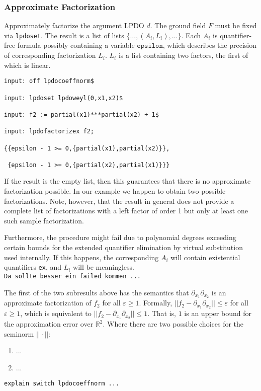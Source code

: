 \subsubsection{Approximate Factorization}

Approximately factorize the argument LPDO $d$. The ground field $F$ must
be fixed via \texttt{lpdoset}. The result is a list of lists
$\{\dots,(A_i,L_i),\dots\}$. Each $A_i$ is quantifier-free formula
possibly containing a variable $\texttt{epsilon}$, which describes the
precision of corresponding factorization $L_i$. $L_i$ is a list
containing two factors, the first of which is linear.

\begin{footnotesize}
\begin{verbatim}
input: off lpdocoeffnorm$

input: lpdoset lpdoweyl(0,x1,x2)$

input: f2 := partial(x1)***partial(x2) + 1$

input: lpdofactorizex f2;

{{epsilon - 1 >= 0,{partial(x1),partial(x2)}},

 {epsilon - 1 >= 0,{partial(x2),partial(x1)}}}
\end{verbatim}
\end{footnotesize}
If the result is the empty list, then this guarantees that there is no
approximate factorization possible. In our example we happen to obtain
two possible factorizations. Note, however, that the result in general
does not provide a complete list of factorizations with a left factor of
order 1 but only at least one such sample factorization.

Furthermore, the procedure might fail due to polynomial degrees
exceeding certain bounds for the extended quantifier elimination by
virtual substitution used internally. If this happens, the corresponding
$A_i$ will contain existential quantifiers \texttt{ex}, and $L_i$ will
be meaningless.\\
\verb!Da sollte besser ein failed kommen ...!

The first of the two subresults above has the semantics that
$\partial_{x_1}\partial_{x_2}$ is an approximate factorization of $f_2$
for all $\varepsilon\geq1$. Formally,
$||f_2-\partial_{x_1}\partial_{x_2}||\leq\varepsilon$ for all
$\varepsilon\geq1$, which is equivalent to
$||f_2-\partial_{x_1}\partial_{x_2}||\leq1$. That is, $1$ is an upper
bound for the approximation error over $\mathbb{R}^2$. Where there are two
possible choices for the seminorm $||\cdot||$:
\begin{enumerate}%
\item ...
\item ...
\end{enumerate}
\verb!explain switch lpdocoeffnorm ...!


